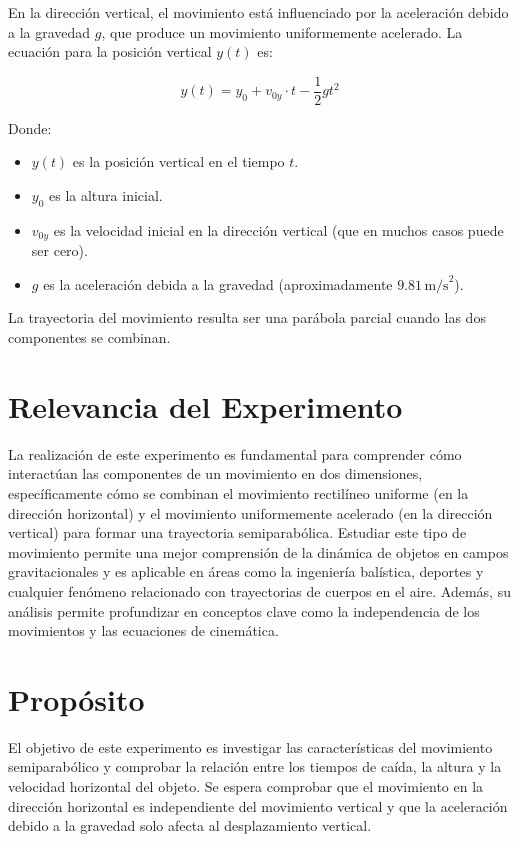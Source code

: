 \documentclass[a4paper,12pt]{article}
\begin{document}
En la dirección vertical, el movimiento está influenciado por la aceleración debido a la gravedad $g$, que produce un movimiento uniformemente acelerado. La ecuación para la posición vertical $y(t)$ es:

\[
y(t) = y_0 + v_{0y} \cdot t - \frac{1}{2} g t^2
\]

Donde:
\begin{itemize}
    \item $y(t)$ es la posición vertical en el tiempo $t$.
    \item $y_0$ es la altura inicial.
    \item $v_{0y}$ es la velocidad inicial en la dirección vertical (que en muchos casos puede ser cero).
    \item $g$ es la aceleración debida a la gravedad (aproximadamente $9.81 \, \text{m/s}^2$).
\end{itemize}

La trayectoria del movimiento resulta ser una parábola parcial cuando las dos componentes se combinan.

\section{Relevancia del Experimento}
La realización de este experimento es fundamental para comprender cómo interactúan las componentes de un movimiento en dos dimensiones, específicamente cómo se combinan el movimiento rectilíneo uniforme (en la dirección horizontal) y el movimiento uniformemente acelerado (en la dirección vertical) para formar una trayectoria semiparabólica. Estudiar este tipo de movimiento permite una mejor comprensión de la dinámica de objetos en campos gravitacionales y es aplicable en áreas como la ingeniería balística, deportes y cualquier fenómeno relacionado con trayectorias de cuerpos en el aire. Además, su análisis permite profundizar en conceptos clave como la independencia de los movimientos y las ecuaciones de cinemática.

\section{Propósito}
El objetivo de este experimento es investigar las características del movimiento semiparabólico y comprobar la relación entre los tiempos de caída, la altura y la velocidad horizontal del objeto. Se espera comprobar que el movimiento en la dirección horizontal es independiente del movimiento vertical y que la aceleración debido a la gravedad solo afecta al desplazamiento vertical.
\end{document}
